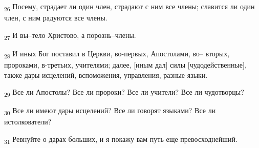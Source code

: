 \begin{tcolorbox}
\textsubscript{26} Посему, страдает ли один член, страдают с ним все члены; славится ли один член, с ним радуются все члены.
\end{tcolorbox}
\begin{tcolorbox}
\textsubscript{27} И вы--тело Христово, а порознь--члены.
\end{tcolorbox}
\begin{tcolorbox}
\textsubscript{28} И иных Бог поставил в Церкви, во-первых, Апостолами, во-- вторых, пророками, в-третьих, учителями; далее, [иным дал] силы [чудодейственные], также дары исцелений, вспоможения, управления, разные языки.
\end{tcolorbox}
\begin{tcolorbox}
\textsubscript{29} Все ли Апостолы? Все ли пророки? Все ли учители? Все ли чудотворцы?
\end{tcolorbox}
\begin{tcolorbox}
\textsubscript{30} Все ли имеют дары исцелений? Все ли говорят языками? Все ли истолкователи?
\end{tcolorbox}
\begin{tcolorbox}
\textsubscript{31} Ревнуйте о дарах больших, и я покажу вам путь еще превосходнейший.
\end{tcolorbox}
